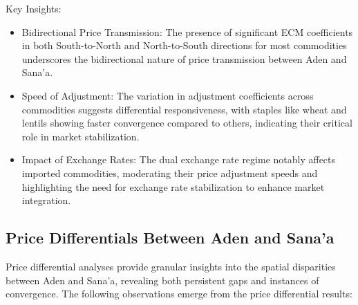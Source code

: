 Key Insights:
\begin{itemize}
\item Bidirectional Price Transmission: The presence of significant ECM coefficients in both South-to-North and North-to-South directions for most commodities underscores the bidirectional nature of price transmission between Aden and Sana'a.

\item Speed of Adjustment: The variation in adjustment coefficients across commodities suggests differential responsiveness, with staples like wheat and lentils showing faster convergence compared to others, indicating their critical role in market stabilization.

\item Impact of Exchange Rates: The dual exchange rate regime notably affects imported commodities, moderating their price adjustment speeds and highlighting the need for exchange rate stabilization to enhance market integration.
\end{itemize}

\subsection{Price Differentials Between Aden and Sana'a}

Price differential analyses provide granular insights into the spatial disparities between Aden and Sana'a, revealing both persistent gaps and instances of convergence. The following observations emerge from the price differential results:

